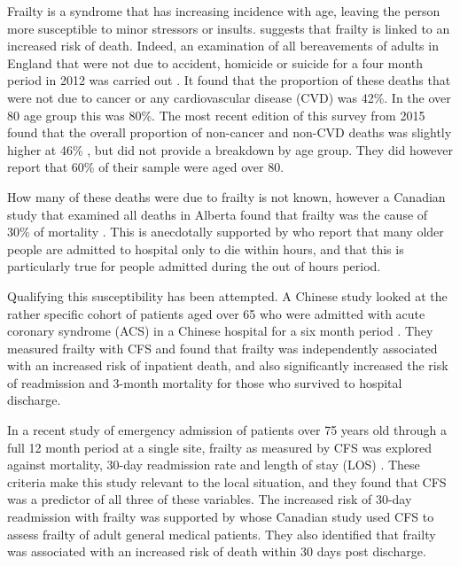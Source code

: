 \documentclass
[
	12pt,
	a4paper,
	oneside,
]{report}
\begin{document}
\label{sec:frailty-implications}
Frailty is a syndrome that has increasing incidence with age, leaving the person
more susceptible to minor stressors or insults. \textcite{collard:12} suggests
that frailty is linked to an increased risk of death. Indeed,
an examination
of all bereavements of adults in England that were not due to accident, homicide or suicide for 
a four month period in 2012 was 
carried out \parencite{ons:13}. It found that the proportion of these deaths
that were not due to cancer or any cardiovascular disease (CVD) was 42\%. 
In the over 80
age group this was 80\%. The most recent edition of this survey from 2015 found
that the overall proportion of non-cancer and non-CVD deaths was slightly higher 
at 46\% \parencite{ons:16}, but did not provide a breakdown by age group. They 
did however report that 60\% of their sample were aged over 80.

How many of these deaths were due to frailty is not known, however 
a Canadian study that examined all deaths in Alberta found that frailty was the
cause of 30\% of mortality \parencite{fassbender:09}. This is anecdotally
supported by \textcite{silver:12} who report that many older people are admitted 
to hospital only to die within hours, and that
this is particularly true for people admitted during the out of hours period.

Qualifying this susceptibility
has been attempted. 
A Chinese study looked at the rather specific cohort of patients aged over 65
who were admitted with acute coronary syndrome (ACS) in a Chinese hospital for 
a six month period \parencite{kang:15}. They measured frailty with CFS and 
found that frailty was independently associated with an increased risk of 
inpatient death, and also significantly increased the risk of readmission and 
3-month mortality for those who survived to hospital discharge.

In a recent study of emergency admission of patients over 
75 years old through a full 12 month period at a single site, frailty as
measured by CFS was explored against mortality, 30-day readmission rate and 
length of stay (LOS)
\parencite{wallis:15}.
These criteria make this study relevant to the local situation, and they found 
that CFS was a predictor of all three of these variables. The increased risk of
30-day readmission with frailty was supported by \textcite{kahlon:15} whose 
Canadian study used CFS to assess frailty of adult general medical patients. 
They also identified that frailty was associated with an increased risk of death
within 30 days post discharge.
\end{document}
